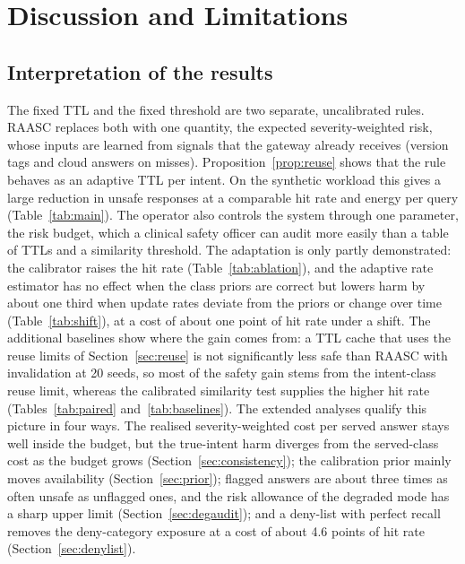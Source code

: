 \documentclass[journal]{IEEEtran}
\begin{document}
\section{Discussion and Limitations}\label{sec:discussion}
\subsection{Interpretation of the results}
The fixed TTL and the fixed threshold are two separate, uncalibrated rules. RAASC replaces both with one quantity, the expected severity-weighted risk, whose inputs are learned from signals that the gateway already receives (version tags and cloud answers on misses). Proposition~\ref{prop:reuse} shows that the rule behaves as an adaptive TTL per intent. On the synthetic workload this gives a large reduction in unsafe responses at a comparable hit rate and energy per query (Table~\ref{tab:main}). The operator also controls the system through one parameter, the risk budget, which a clinical safety officer can audit more easily than a table of TTLs and a similarity threshold. The adaptation is only partly demonstrated: the calibrator raises the hit rate (Table~\ref{tab:ablation}), and the adaptive rate estimator has no effect when the class priors are correct but lowers harm by about one third when update rates deviate from the priors or change over time (Table~\ref{tab:shift}), at a cost of about one point of hit rate under a shift. The additional baselines show where the gain comes from: a TTL cache that uses the reuse limits of Section~\ref{sec:reuse} is not significantly less safe than RAASC with invalidation at 20 seeds, so most of the safety gain stems from the intent-class reuse limit, whereas the calibrated similarity test supplies the higher hit rate (Tables~\ref{tab:paired} and~\ref{tab:baselines}). The extended analyses qualify this picture in four ways. The realised severity-weighted cost per served answer stays well inside the budget, but the true-intent harm diverges from the served-class cost as the budget grows (Section~\ref{sec:consistency}); the calibration prior mainly moves availability (Section~\ref{sec:prior}); flagged answers are about three times as often unsafe as unflagged ones, and the risk allowance of the degraded mode has a sharp upper limit (Section~\ref{sec:degaudit}); and a deny-list with perfect recall removes the deny-category exposure at a cost of about 4.6 points of hit rate (Section~\ref{sec:denylist}).
\end{document}
